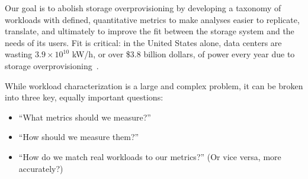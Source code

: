 
Our goal is to abolish storage overprovisioning  by developing a
taxonomy of workloads with defined, quantitative metrics to make analyses
easier to replicate, translate, and ultimately to improve the fit between the
storage system and the needs of its users. Fit is critical: in the United States alone, data centers are wasting
$3.9\times10^{10}$ kW/h, or over \$3.8 billion dollars, of power every year due
to storage overprovisioning~\cite{nrdc}.

%







While workload characterization is a large and complex problem, it can be broken
into three key, equally important questions:
\begin{itemize}
  \item ``What metrics should we measure?''
  \item ``How should we measure them?''
  \item ``How do we match real workloads to our metrics?''  (Or vice versa, more accurately?)
\end{itemize}



